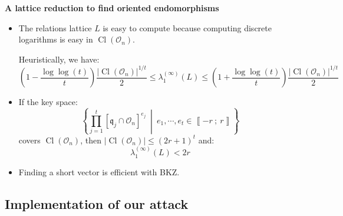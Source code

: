 \documentclass[10pt]{beamer}
\theoremstyle{plain}
\theoremstyle{definition}
\newcommand{\mO}{\mathcal{O}}
\renewcommand{\i}[2]{\left\llbracket #1~;~#2\right\rrbracket}
\renewcommand{\(}{\left(}
\renewcommand{\)}{\right)}
\newcommand{\mf}[1]{\mathfrak{#1}}
\DeclareMathOperator{\Cl}{Cl}
\begin{document}
\begin{frame}
\textbf{A lattice reduction to find oriented endomorphisms}

\vspace{0.3cm}

\begin{itemize}
\item The relations lattice $L$ is easy to compute because computing discrete logarithms is easy in $\Cl(\mO_n)$.

\pause 

\begin{lemma}
Heuristically, we have:
\[\(1-\frac{\log\log(t)}{t}\)\frac{|\Cl(\mO_n)|^{1/t}}{2}\leq \lambda_1^{(\infty)}(L)\leq \(1+\frac{\log\log(t)}{t}\)\frac{|\Cl(\mO_n)|^{1/t}}{2}\]
\end{lemma}

\pause 

\item If the key space:
\[\left\{\prod_{j=1}^t [\mf{q}_j\cap\mO_n]^{e_j} \ \middle| \ e_1,\cdots, e_t\in\i{-r}{r} \right\}\]
covers $\Cl(\mO_n)$, then $|\Cl(\mO_n)|\leq (2r+1)^t$ and:
\[\lambda_1^{(\infty)}(L)<2r\]

\item Finding a short vector is efficient with BKZ.
\end{itemize}
\end{frame}

\subsection{Implementation of our attack}
\end{document}

